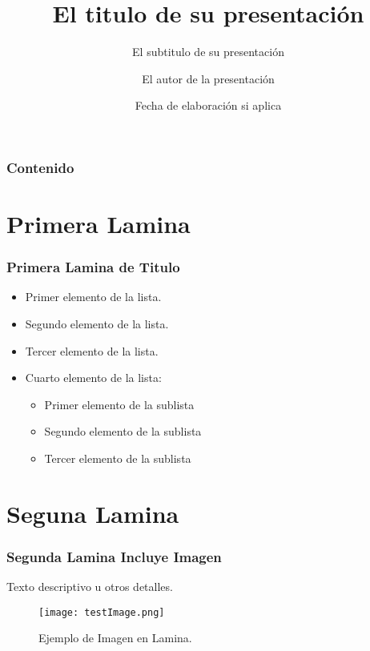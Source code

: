\documentclass[11pt]{beamer}
\title{El titulo de su presentación}
\subtitle{El subtitulo de su presentación}
\author{El autor de la presentación}
\institute{Nombre de la institución si aplica}
\date{Fecha de elaboración si aplica}
\begin{document}
\begin{frame}
\titlepage
\end{frame}

\begin{frame}
\frametitle{Contenido}
\renewcommand\contentsname{Índice}
\tableofcontents 
\end{frame}

\section{Primera Lamina}
\begin{frame}
\frametitle{Primera Lamina de Titulo}
\begin{itemize}
	\item  Primer elemento de la lista.
	\item  Segundo elemento de la lista.
	\item  Tercer elemento de la lista.
	\item  Cuarto elemento de la lista:
		\begin{itemize}
			\item	Primer elemento de la sublista
			\item	Segundo elemento de la sublista
			\item	Tercer elemento de la sublista
		\end{itemize}		 
\end{itemize}	 	
\end{frame}

\section{Seguna Lamina}
\begin{frame}
\frametitle{Segunda Lamina Incluye Imagen}
Texto descriptivo u otros detalles.\\
	\begin{figure}[!htb]
		\begin{center}
			\texttt{[image: testImage.png]}
		\end{center}
		 \caption{Ejemplo de Imagen en Lamina.}								
	\end{figure}
\end{frame}
\end{document}
